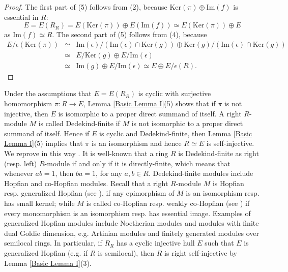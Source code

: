 \documentclass{amsart}
\theoremstyle{plain}
\numberwithin{equation}{section}
\begin{document}
\begin{proof}
The first part of (5) follows from (2), because $\mathrm{K} \mathrm{e} \mathrm{r} (\pi ) \oplus \mathrm{I} \mathrm{m} (f)$ is essential in $R$:
\begin{equation*}E =E (R_{R}) =E (\mathrm{K} \mathrm{e} \mathrm{r} (\pi )) \oplus E (\mathrm{I} \mathrm{m} (f)) \simeq E (\mathrm{K} \mathrm{e} \mathrm{r} (\pi )) \oplus E
\end{equation*}as $\mathrm{I} \mathrm{m} (f) \simeq R$. The second part of (5) follows from (4), because
\begin{eqnarray*}E/\epsilon  (\mathrm{K} \mathrm{e} \mathrm{r} (\pi )) &\simeq& \mathrm{I} \mathrm{m} (\epsilon )/\left (\mathrm{I} \mathrm{m} (\epsilon ) \cap \mathrm{K} \mathrm{e} \mathrm{r} (g)\right ) \oplus \mathrm{K} \mathrm{e} \mathrm{r} (g)/\left (\mathrm{I} \mathrm{m} (\epsilon ) \cap \mathrm{K} \mathrm{e} \mathrm{r} (g)\right ) \\
 &  \simeq  & E/\mathrm{K} \mathrm{e} \mathrm{r} (g) \oplus E/\mathrm{I} \mathrm{m} (\epsilon ) \\
 &  \simeq  & \mathrm{I} \mathrm{m} (g) \oplus E/\mathrm{I} \mathrm{m} (\epsilon ) \simeq E \oplus E/\epsilon  (R)\text{.}\end{eqnarray*}
\end{proof}

Under the assumptions that $E =E (R_{R})$ is cyclic with surjective homomorphism $\pi  :R \rightarrow E$, Lemma \ref{Basic Lemma I}(5) shows that if $\pi $ is not injective, then $E$ is isomorphic to a proper direct summand of itself. A right $R$-module $M$ is called  {Dedekind-finite} if $M$ is not isomorphic to a proper direct summand of itself. Hence if $E$ is cyclic and Dedekind-finite, then Lemma \ref{Basic Lemma I}(5) implies that $\pi $ is an isomorphism and hence $R \simeq E$ is self-injective. We reprove in this way \cite[Proposition 2.9]{IY 5}.
It is well-known that a ring $R$ is Dedekind-finite as right (resp. left) $R$-module if and only if it is  {directly-finite}, which means that whenever $a b =1$, then $b a =1$, for any $a ,b \in R$. Dedekind-finite modules include Hopfian and co-Hopfian modules. Recall that a right $R$-module $M$ is  {Hopfian} resp.  {generalized Hopfian} (see \cite{GH}),
if any epimorphism of $M$ is an isomorphism resp. has small kernel; while $M$ is called  {co-Hopfian} resp.  {weakly co-Hopfian} (see \cite{HV})
if every monomorphism is an isomorphism resp. has essential image. Examples of generalized Hopfian modules include Noetherian modules and modules with finite dual Goldie dimension, e.g. Artinian modules and finitely generated modules over semilocal rings. In particular, if $R_{R}$ has a cyclic injective hull $E$ such that $E$ is generalized Hopfian (e.g. if $R$ is semilocal), then $R$ is right self-injective by Lemma \ref{Basic Lemma I}(3). 
\end{document}
